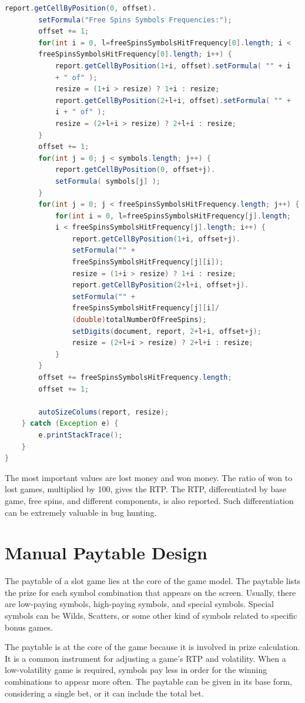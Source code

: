 \documentclass[12pt,twoside,openany]{book}
\begin{document}
\begin{lstlisting}[language=Java, caption={Statistical report}, label=listing030]
		report.getCellByPosition(0, offset).
		setFormula("Free Spins Symbols Frequencies:");
		offset += 1;
		for(int i = 0, l=freeSpinsSymbolsHitFrequency[0].length; i <
		freeSpinsSymbolsHitFrequency[0].length; i++) {
			report.getCellByPosition(1+i, offset).setFormula( "" + i
			+ " of" );
			resize = (1+i > resize) ? 1+i : resize;
			report.getCellByPosition(2+l+i, offset).setFormula( "" +
			i + " of" );
			resize = (2+l+i > resize) ? 2+l+i : resize;
		}
		offset += 1;
		for(int j = 0; j < symbols.length; j++) {
			report.getCellByPosition(0, offset+j).
			setFormula( symbols[j] );
		}
		for(int j = 0; j < freeSpinsSymbolsHitFrequency.length; j++) {
			for(int i = 0, l=freeSpinsSymbolsHitFrequency[j].length;
			i < freeSpinsSymbolsHitFrequency[j].length; i++) {
				report.getCellByPosition(1+i, offset+j).
				setFormula("" +
				freeSpinsSymbolsHitFrequency[j][i]);
				resize = (1+i > resize) ? 1+i : resize;
				report.getCellByPosition(2+l+i, offset+j).
				setFormula("" +
				freeSpinsSymbolsHitFrequency[j][i]/
				(double)totalNumberOfFreeSpins);
				setDigits(document, report, 2+l+i, offset+j);
				resize = (2+l+i > resize) ? 2+l+i : resize;
			}
		}
		offset += freeSpinsSymbolsHitFrequency.length;
		offset += 1;

		autoSizeColums(report, resize);
	} catch (Exception e) {
		e.printStackTrace();
	}
}
\end{lstlisting}

The most important values are lost money and won money. The ratio of won to lost games, multiplied by 100, gives the RTP. The RTP, differentiated by base game, free spins, and different components, is also reported. Such differentiation can be extremely valuable in bug hunting.

\chapter{Manual Paytable Design}

The paytable of a slot game lies at the core of the game model. The paytable lists the prize for each symbol combination that appears on the screen. Usually, there are low-paying symbols, high-paying symbols, and special symbols. Special symbols can be Wilds, Scatters, or some other kind of symbols related to specific bonus games.

The paytable is at the core of the game because it is involved in prize calculation. It is a common instrument for adjusting a game's RTP and volatility. When a low-volatility game is required, symbols pay less in order for the winning combinations to appear more often. The paytable can be given in its base form, considering a single bet, or it can include the total bet.
\end{document}
